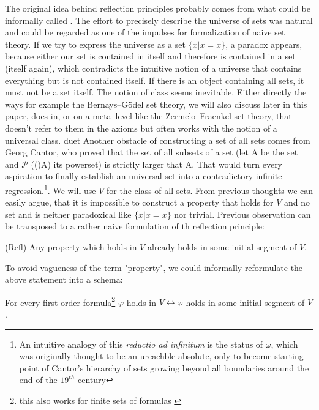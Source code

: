 \documentclass[12pt,a4paper]{article}
\newcommand{\power}[1]{\ensuremath{\mathscr{P}} (#1)}
\renewcommand{\iff}{\leftrightarrow}
\begin{document}
The original idea behind reflection principles probably comes from what could be informally called .
The effort to precisely describe the universe of sets was natural and could be regarded as one of the impulses for formalization of naive set theory.
If we try to express the universe as a set $\{x  |  x = x\}$, a paradox appears, because either our set is contained in itself and therefore is contained in a set (itself again), which contradicts the intuitive notion of a universe that contains everything but is not contained itself.
If there is an object containing all sets, it must not be a set itself. The notion of class seems inevitable. Either directly the ways for example the Bernays–Gödel set theory, we will also discuss later in this paper, does in, or on a meta–level like the Zermelo–Fraenkel set theory, that doesn't refer to them in the axioms but often works with the notion of a universal class.
duet
Another obstacle of constructing a set of all sets comes from Georg Cantor, who proved that the set of all subsets of a set (let A be the set and \power(A) its powerset) is strictly larger that A. That would turn every aspiration to finally establish an universal set into a contradictory infinite regression.\footnote{An intuitive analogy of this \emph{reductio ad infinitum} is the status of $\omega$, which was originally thought to be an ureachble absolute, only to become starting point of Cantor's hierarchy of sets growing beyond all boundaries around the end of the $19^{th}$ century}. We will use $V$ for the class of all sets. %
\newpage
From previous thoughts we can easily argue, that it is impossible to construct a property that holds for $V$ and no set and is neither paradoxical like $\{x  |  x = x\}$ nor trivial. Previous observation can be transposed to a rather naive formulation of th reflection principle:


\medskip

(Refl) Any property which holds in $V$ already holds in some initial segment of $V$. 

\medskip

To avoid vagueness of the term "property", we could informally reformulate the above statement into a schema: 

\medskip

For every first-order formula\footnote{this also works for finite sets of formulas \cite[p.~168]{JechBook}} $\varphi$ holds in $V \iff \varphi$ holds in some initial segment of $V$.
\end{document}

